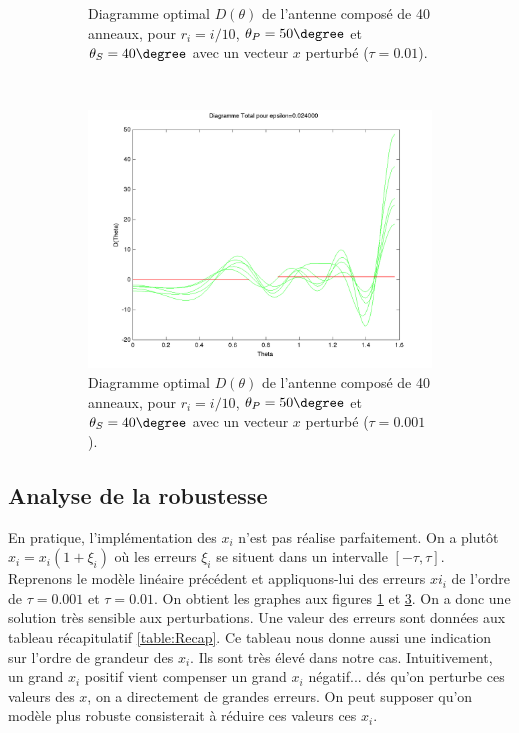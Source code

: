 \begin{figure}[h!]
\begin{subfigure}[b]{0.32\textwidth}
  \caption{Diagramme optimal $D(\theta)$ de l'antenne composé de 40 anneaux, pour $r_i=i/10$, $\theta_P=50 \degree$ et $\theta_S=40 \degree$ avec un vecteur $x$ perturbé ($\tau = 0.01$).}
  \label{fig:D-ModLin-RobustTau01}
  \end{subfigure}
   ~ 
  \begin{subfigure}[b]{0.32\textwidth}
  \includegraphics[width=\textwidth]{D-ModLin-2RobustTau001.png}
  \caption{Diagramme optimal $D(\theta)$ de l'antenne composé de 40 anneaux, pour $r_i=i/10$, $\theta_P=50 \degree$ et $\theta_S=40 \degree$ avec un vecteur $x$ perturbé ($\tau=0.001$).}
  \label{fig:D-ModLin-RobustTau001}
  \end{subfigure}
  \caption{}
  \end{figure}


\subsection{Analyse de la robustesse}
En pratique, l'implémentation des $x_i$ n'est pas réalise parfaitement. On a plutôt $\hat{x}_i = x_i(1+\xi_i)$ où les erreurs $\xi_i$ se situent dans un intervalle $[-\tau,\tau]$.\\
Reprenons le modèle linéaire précédent et appliquons-lui des erreurs $xi_i$ de l'ordre de $\tau=0.001$ et $\tau=0.01$. On obtient les graphes aux figures \ref{fig:D-ModLin-RobustTau01} et \ref{fig:D-ModLin-RobustTau001}. On a donc une solution très sensible aux perturbations. Une valeur des erreurs sont données aux tableau récapitulatif \ref{table:Recap}. Ce tableau nous donne aussi une indication sur l'ordre de grandeur des $x_i$. Ils sont très élevé dans notre cas. Intuitivement, un grand $x_i$ positif vient compenser un grand $x_i$ négatif... dés qu'on perturbe ces valeurs des $x$, on a directement de grandes erreurs. On peut supposer qu'on modèle plus robuste consisterait à réduire ces valeurs ces $x_i$.









